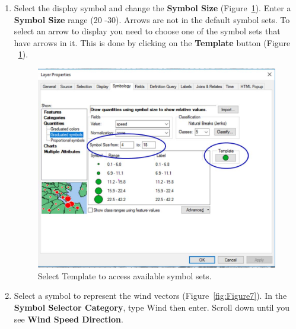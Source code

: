 \documentclass[12pt]{article}
\begin{document}
\begin{enumerate}[resume]
\item Select the display symbol and change the \textbf{Symbol Size} (Figure~\ref{fig:Figure6}). Enter a \textbf{Symbol Size} range (20 -30).
Arrows are not in the default symbol sets. To select an arrow to display you need to choose one of the
symbol sets that have arrows in it. This is done by clicking on the \textbf{Template} button (Figure ~\ref{fig:Figure6}).

\begin{figure}[H]
	\centering
	\includegraphics[scale=0.35]{arc_6.png}
	\caption{Select Template to access available symbol sets.}
\label{fig:Figure6}
\end{figure}

\item Select a symbol to represent the wind vectors (Figure~\ref{fig:Figure7}). In the \textbf{Symbol Selector Category}, type Wind then
enter. Scroll down until you see \textbf{Wind Speed Direction}.


\end{enumerate}
\end{document}

